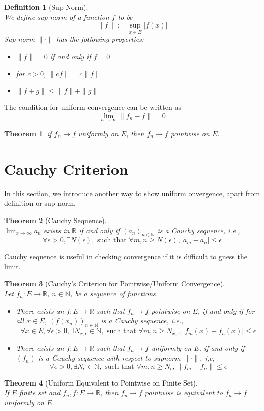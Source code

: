 \documentclass[12pt]{article}
\newtheorem{definition}{Definition}[section]
\newtheorem{theorem}{Theorem}[section]
\theoremstyle{definition}
\begin{document}
\begin{definition}[Sup Norm]
\hfill\\\normalfont We define sup-norm of a function $f$ to be
\[
\|f\|:=\sup_{x\in E}|f(x)|
\]
Sup-norm $\|\cdot\|$ has the following properties:
\begin{itemize}
	\item $\|f\|=0$ if and only if $f=0$
	\item for $c>0$, $\|cf\|=c\|f\|$
	\item $\|f+g\|\leq\|f\|+\|g\|$ 
\end{itemize}
\end{definition}
The condition for uniform convergence can be written as
\[
\lim_{n\to\infty}\|f_n-f\|=0
\]
\begin{theorem}\normalfont if $f_n\to f$ uniformly on $E$, then $f_n\to f$ pointwise on $E$.\end{theorem}
\clearpage
\section{Cauchy Criterion}
In this section, we introduce another way to show uniform onvergence, apart from definition or sup-norm.
\begin{theorem}[Cauchy Sequence]
\hfill\\\normalfont $\lim_{x\to \infty}a_n$ exists in $\mathbb{R}$ \textit{if and only if} $(a_n)_{n\in \mathbb{N}}$ is a Cauchy sequence, i.e.,
\[
\forall \epsilon>0, \exists N(\epsilon), \text{ such that }\forall m,n\geq N(\epsilon), |a_m-a_n|\leq \epsilon
\]
\end{theorem}
Cauchy sequence is useful in checking convergence if it is difficult to guess the limit.
\begin{theorem}[Cauchy's Criterion for Pointwise/Uniform Convergence]
\hfill\\\normalfont Let $f_n:E\to\mathbb{R}$, $n\in \mathbb{N}$, be a sequence of functions.
\begin{itemize}
	\item There exists an $f:E\to\mathbb{R}$ such that $f_n\to f$ pointwise on $E$, if and only if for all $x\in E$, $(f(x_n))_{n\in\mathbb{N}}$ is a Cauchy sequence, i.e.,
	\[
\forall x\in E, \forall \epsilon>0, \exists N_{x, \epsilon}\in \mathbb{N}, \text{ such that }\forall m,n\geq N_{x,\epsilon}, |f_m(x)-f_n(x)|\leq \epsilon
	\]
	\item There exists an $f:E\to\mathbb{R}$ such that $f_n\to f$ uniformly on $E$, if and only if $(f_n)$ is a Cauchy sequence with respect to supnorm $\|\cdot\|$, i,e,
	\[
\forall \epsilon>0, \exists N_{\epsilon}\in\mathbb{N},\text{ such that }\forall m,n\geq N_{\epsilon}, \|f_m-f_n\|\leq \epsilon
	\]
\end{itemize}
\end{theorem}
\begin{theorem}[Uniform Equivalent to Pointwise on Finite Set]
\hfill\\\normalfont If $E$ finite set and $f_n,f:E\to \mathbb{R}$, then $f_n\to f$ pointwise is equivalent to $f_n\to f$ uniformly on $E$.
\end{theorem}
\clearpage
\end{document}

